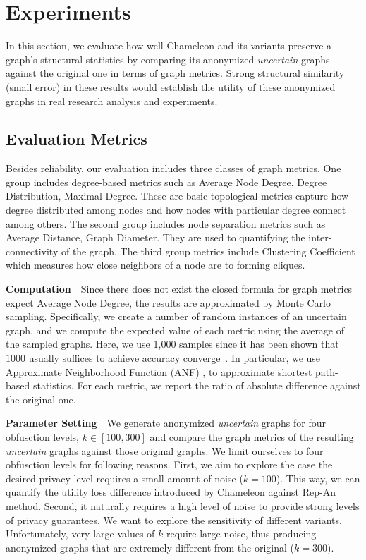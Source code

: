 \section{Experiments}
\label{sec:exp}
In this section, we evaluate how well Chameleon and its variants preserve a graph's structural statistics by comparing its anonymized \emph{uncertain} graphs against the original one in terms of graph metrics. Strong structural similarity (small error) in these results would establish the utility of these anonymized graphs in real research analysis and experiments. 

\subsection{Evaluation Metrics}
Besides reliability, our evaluation includes three classes of graph metrics. 
One group includes degree-based metrics such as Average Node Degree, Degree Distribution, Maximal Degree. These are basic topological metrics capture how degree distributed among nodes and how nodes with particular degree connect among others. The second group includes node separation metrics such as Average Distance, Graph Diameter. They are used to quantifying the inter-connectivity of the graph. The third group metrics include Clustering Coefficient which measures how close neighbors of a node are to forming cliques.

\textbf{Computation}~~Since there does not exist the closed formula for graph metrics expect Average Node Degree, the results are approximated by Monte Carlo sampling. Specifically, we create a number of random instances of an uncertain graph, and we compute the expected value of each metric using the average of the sampled graphs. Here, we use 1,000 samples since it has been shown that $1000$ usually suffices to achieve accuracy converge~\cite{Potamias_K_2010,Jin_Distance_2011}. In particular, we use Approximate Neighborhood Function (ANF) \cite{Boldi_Rosa_Vigna_2011}, to approximate shortest path-based statistics. For each metric, we report the ratio of absolute difference against the original one. 

\textbf{Parameter Setting}~~We generate anonymized \emph{uncertain} graphs for four obfusction levels, $k \in [100,300]$ and compare the graph metrics of the resulting \emph{uncertain} graphs against those original graphs. We limit ourselves to four obfusction levels for following reasons. 
First, we aim to explore the case the desired privacy level requires a small amount of noise ($k=100$). This way, we can quantify the utility loss difference introduced by Chameleon against Rep-An method. Second, it naturally requires a high level of noise to provide strong levels of privacy guarantees. We want to explore the sensitivity of different variants. Unfortunately, very large values of $k$ require large noise, thus producing anonymized graphs that are extremely different from the original ($k=300$). 


